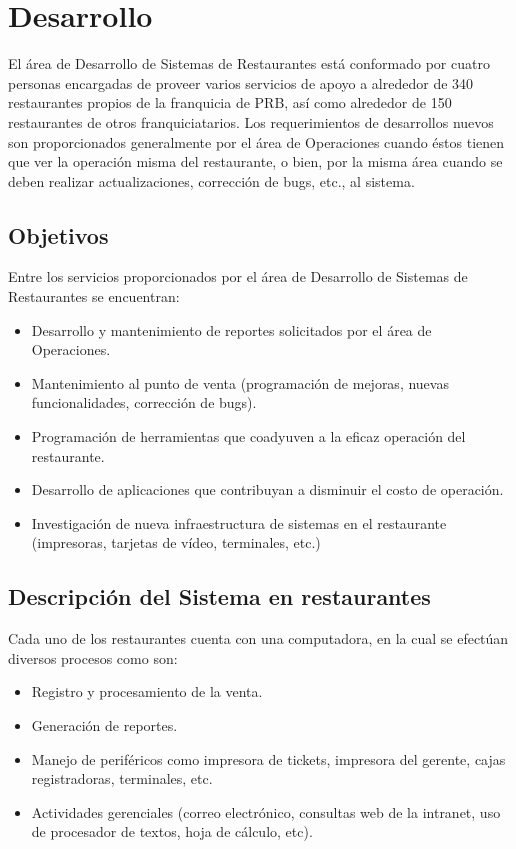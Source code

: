 
\chapter{Desarrollo}
\label{chap:desarrollo}

El área de Desarrollo de Sistemas de Restaurantes está conformado por cuatro personas encargadas de proveer varios servicios de apoyo a alrededor de 340 restaurantes propios de la franquicia de PRB, así como alrededor de 150 restaurantes de otros franquiciatarios. Los requerimientos de desarrollos nuevos son proporcionados generalmente por el área de Operaciones cuando éstos tienen que ver la operación misma del restaurante, o bien, por la misma área cuando se deben realizar actualizaciones, corrección de bugs, etc., al sistema.

\section{Objetivos}
\label{sec:objetivos}

Entre los servicios proporcionados por el área de Desarrollo de Sistemas de Restaurantes se encuentran:

\begin{itemize}
 \item Desarrollo y mantenimiento de reportes solicitados por el área de Operaciones.
 \item Mantenimiento al punto de venta (programación de mejoras, nuevas funcionalidades, corrección de bugs).
 \item Programación de herramientas que coadyuven a la eficaz operación del restaurante.
 \item Desarrollo de aplicaciones que contribuyan a disminuir el costo de operación.
 \item Investigación de nueva infraestructura de sistemas en el restaurante (impresoras, tarjetas de vídeo, terminales, etc.)
\end{itemize}

\section{Descripción del Sistema en restaurantes}
\label{sec:descripcion}

Cada uno de los restaurantes cuenta con una computadora, en la cual se efectúan diversos procesos como son:

\begin{itemize}
 \item Registro y procesamiento de la venta.
 \item Generación de reportes.
 \item Manejo de periféricos como impresora de tickets, impresora del gerente, cajas registradoras, terminales, etc.
 \item Actividades gerenciales (correo electrónico, consultas web de la intranet, uso de procesador de textos, hoja de cálculo, etc).
\end{itemize}

